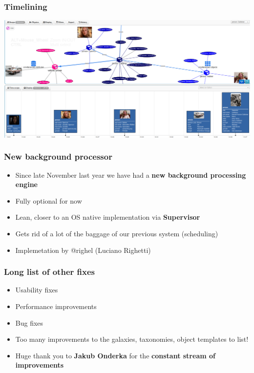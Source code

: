 \begin{frame}
\frametitle{Timelining}
\includegraphics[scale=0.2]{images/timelining.png}
\end{frame}

\begin{frame}
  \frametitle{New background processor}
  \begin{itemize}
     \item Since late November last year we have had a {\bf new background processing engine}
     \item Fully optional for now
     \item Lean, closer to an OS native implementation via {\bf Supervisor}
     \item Gets rid of a lot of the baggage of our previous system (scheduling)
     \item Implemetation by @righel (Luciano Righetti)
  \end{itemize}
\end{frame}


\begin{frame}
  \frametitle{Long list of other fixes}
  \begin{itemize}
     \item Usability fixes
     \item Performance improvements
     \item Bug fixes
     \item Too many improvements to the galaxies, taxonomies, object templates to list!
     \item Huge thank you to {\bf Jakub Onderka} for the {\bf constant stream of improvements}
  \end{itemize}
\end{frame}

